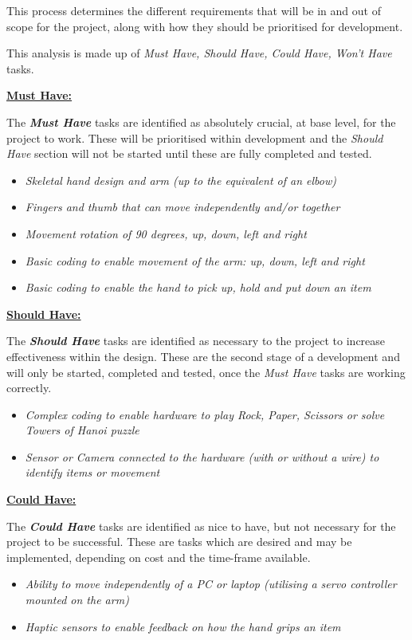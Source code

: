 \documentclass[progress]{cmpreport}
\begin{document}
This process determines the different requirements that will be in and out of scope for the project, along with how they should be prioritised for development. 

This analysis is made up of \textit{Must Have, Should Have, Could Have, Won't Have} tasks. \newline

\textbf{\underline{Must Have:}} 

The \textbf{\textit{Must Have}} tasks are identified as absolutely crucial, at base level, for the project to work. These will be prioritised within development and the \textit{Should Have} section will not be started until these are fully completed and tested. 

\begin{itemize}
	\item \textit{Skeletal hand design and arm (up to the equivalent of an elbow)}
	\item \textit{Fingers and thumb that can move independently and/or together}
	\item \textit{Movement rotation of 90 degrees, up, down, left and right}
	\item \textit{Basic coding to enable movement of the arm: up, down, left and right}
	\item \textit{Basic coding to enable the hand to pick up, hold and put down an item}  \newline
\end{itemize} 

\textbf{\underline{Should Have:}} 

The \textbf{\textit{Should Have}} tasks are identified as necessary to the project to increase effectiveness within the design. These are the second stage of a development and will only be started, completed and tested, once the \textit{Must Have} tasks are working correctly.

\begin{itemize}	
	\item \textit{Complex coding to enable hardware to play Rock, Paper, Scissors or solve Towers of Hanoi puzzle}
	\item \textit{Sensor or Camera connected to the hardware (with or without a wire) to identify items or movement} \newline
\end{itemize}	

\textbf{\underline{Could Have:}}
 
The \textbf{\textit{Could Have}} tasks are identified as nice to have, but not necessary for the project to be successful. These are tasks which are desired and may be implemented, depending on cost and the time-frame available. 
\begin{itemize}	
	\item \textit{Ability to move independently of a PC or laptop (utilising a servo controller mounted on the arm)}
	\item \textit{Haptic sensors to enable feedback on how the hand grips an item} \newline
\end{itemize}
\end{document}
